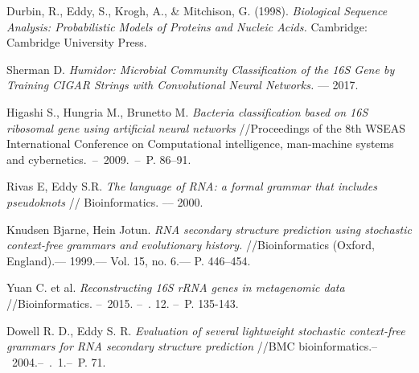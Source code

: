 \documentclass[12pt]{article}  %
\theoremstyle{definition}
\theoremstyle{remark}
\begin{document}
\begin{thebibliography}{9}



Durbin, R., Eddy, S., Krogh, A., \& Mitchison, G. (1998). \emph{Biological Sequence Analysis: Probabilistic Models of Proteins and Nucleic Acids.} Cambridge: Cambridge University Press.

Sherman D. \emph{Humidor: Microbial Community Classification of the
16S Gene by Training CIGAR Strings with Convolutional Neural
Networks.} –– 2017.

Higashi S., Hungria M., Brunetto M. 
\emph{Bacteria classification based on 16S ribosomal gene using artificial neural networks}
//Proceedings of the 8th WSEAS International Conference on Computational intelligence, man-machine systems and cybernetics.~--~2009.~--~P. 86--91.

Rivas E, Eddy S.R. \emph{The language of RNA: a formal grammar that includes pseudoknots} // Bioinformatics. –– 2000.


Knudsen Bjarne, Hein Jotun. 
\emph{RNA secondary structure prediction using stochastic context-free grammars and evolutionary history.} //Bioinformatics (Oxford, England).–– 1999.–– Vol. 15, no. 6.–– P. 446–454.

Yuan C. et al. \emph{Reconstructing 16S rRNA genes in metagenomic data} //Bioinformatics. --~2015. --~\textnumero. 12. --~P. 135-143.

Dowell R. D., Eddy S. R. 
\emph{Evaluation of several lightweight stochastic context-free grammars for RNA secondary structure prediction} //BMC bioinformatics.--~2004.--~\textnumero .~1.--~P. 71.

\end{thebibliography}
\end{document}
